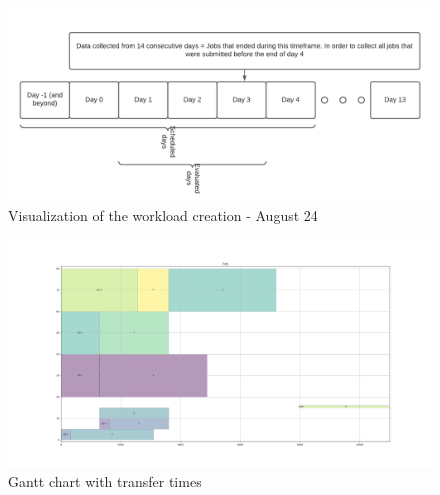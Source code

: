 \documentclass[a4paper]{article}
\begin{document}
\begin{figure}[H]\centering\includegraphics[width=1\linewidth]{Images/Workload_generation.png}\caption{Visualization of the workload creation - August 24}\label{44}\end{figure}
\begin{figure}[H]\centering\includegraphics[width=1\linewidth]{MBSS/plot/Gantt_charts/Fcfs_with_transfer_time.png}\caption{Gantt chart with transfer times}\label{31}\end{figure}
\end{document}
